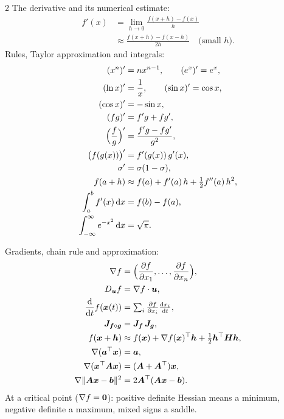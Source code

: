\begin{multicols}{2}
The derivative and its numerical estimate:
\begin{align*}
  f'(x) &= \lim_{h \to 0}\frac{f(x + h) - f(x)}{h}\\
  &\approx \frac{f(x + h) - f(x - h)}{2h} \quad\text{(small } h\text{)}.
\end{align*}
Rules, Taylor approximation and integrals:
\begin{align*}
  (x^n)' &= nx^{n-1}, \qquad (e^x)' = e^x,\\
  (\ln x)' &= \frac1x, \qquad (\sin x)' = \cos x,\\
  (\cos x)' &= -\sin x,\\
  (fg)' &= f'g + fg',\\
  \Bigl(\frac fg\Bigr)' &= \frac{f'g - fg'}{g^2},\\
  \bigl(f(g(x))\bigr)' &= f'(g(x))\,g'(x),\\
  \sigma' &= \sigma(1 - \sigma),\\
  f(a + h) &\approx f(a) + f'(a)\,h + \tfrac12f''(a)\,h^2,\\
  \int_a^bf'(x)\,\mathrm{d} x &= f(b) - f(a),\\
  \int_{-\infty}^{\infty}e^{-x^2}\,\mathrm{d} x &= \sqrt\pi .
\end{align*}

Gradients, chain rule and approximation:
\begin{align*}
  \nabla f &= \Bigl(\frac{\partial f}{\partial x_1}, \dots, \frac{\partial f}{\partial x_n}\Bigr),\\
  D_{\bm{u}}f &= \nabla f\cdot\bm{u},\\
  \frac{\mathrm{d} }{\mathrm{d} t}f(\bm{x}(t)) &= \textstyle\sum_i\frac{\partial f}{\partial x_i}\frac{\mathrm{d} x_i}{\mathrm{d} t},\\
  \bm{J}_{\bm{f}\circ\bm{g}} &= \bm{J}_{\bm{f}}\,\bm{J}_{\bm{g}},\\
  f(\bm{x} + \bm{h}) &\approx f(\bm{x}) + \nabla f(\bm{x})^\top\bm{h} + \tfrac12\bm{h}^\top\bm{H}\bm{h},\\
  \nabla(\bm{a}^\top\bm{x}) &= \bm{a},\\
  \nabla(\bm{x}^\top\bm{A}\bm{x}) &= (\bm{A} + \bm{A}^\top)\bm{x},\\
  \nabla\lVert\bm{A}\bm{x} - \bm{b}\rVert^2 &= 2\bm{A}^\top(\bm{A}\bm{x} - \bm{b}).
\end{align*}
At a critical point ($\nabla f = \bm{0}$): positive definite Hessian means a
minimum, negative definite a maximum, mixed signs a saddle.


\end{multicols}

